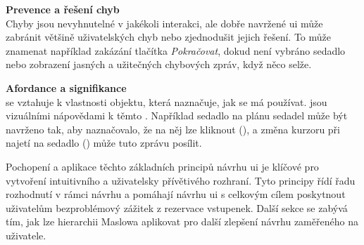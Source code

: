 \textbf{Prevence a řešení chyb}\\
Chyby jsou nevyhnutelné v jakékoli interakci, ale dobře navržené \ac{ui} může zabránit většině uživatelských chyb nebo zjednodušit jejich řešení\cite{d_resources_ui_design_principles}.
To může znamenat například zakázání tlačítka \textit{Pokračovat}, dokud není vybráno sedadlo nebo zobrazení jasných a užitečných chybových zpráv, když něco selže.

\textbf{Afordance a signifikance}\\
 se vztahuje k vlastnosti objektu, která naznačuje, jak se má používat.
 jsou vizuálními nápovědami k těmto \cite{w_topics_affordances}.
Například sedadlo na plánu sedadel může být navrženo tak, aby naznačovalo, že na něj lze kliknout (), a změna kurzoru při najetí na sedadlo () může tuto zprávu posílit.

Pochopení a aplikace těchto základních principů návrhu \ac{ui} je klíčové pro vytvoření intuitivního a uživatelsky přívětivého rozhraní.
Tyto principy řídí řadu rozhodnutí v rámci návrhu a pomáhají návrhu \ac{ui} s celkovým cílem poskytnout uživatelům bezproblémový zážitek z rezervace vstupenek.
Další sekce se zabývá tím, jak lze hierarchii Maslowa aplikovat pro další zlepšení návrhu zaměřeného na uživatele.
